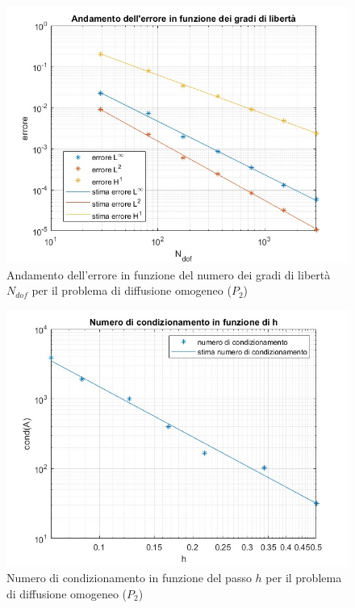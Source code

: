 \documentclass[%
	corpo=11pt,
    twoside,
    stile=classica,
    oldstyle,
    tipotesi=custom,
    greek,
    evenboxes,
]{toptesi}
\begin{document}
    \begin{figure}[htbp]
  \centering
    \includegraphics[scale=0.4]{Pictures/errore-p2-gdl.jpg}
    \caption{Andamento dell'errore in funzione del numero dei gradi di libertà $N_{dof}$ per il problema di diffusione omogeneo ($P_2$)}
    \label{fig:p2_gdl}
    \end{figure}

\begin{figure}[htbp]
  \centering
    \includegraphics[scale=0.4]{Pictures/condiz-p2.jpg}
    \caption{Numero di condizionamento in funzione del passo $h$ per il problema di diffusione omogeneo ($P_2$)}
    \label{fig:p2_cond}
    \end{figure}
\end{document}
